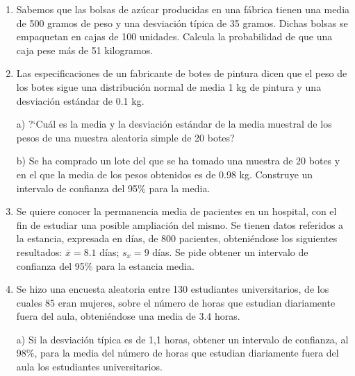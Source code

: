\begin{adjustwidth}{20pt}{10pt}
\begin{enumerate}[PB. 1. ]
	\item 	Sabemos que las bolsas de azúcar producidas en una fábrica tienen una media de 500 gramos de peso y una desviación típica de 35 gramos. Dichas bolsas se empaquetan en cajas de 100 unidades. Calcula la probabilidad de que una caja pese más de 51 kilogramos.
		
		\hspace{-1cm}\vspace{1cm}
		
	\item 	Las especificaciones de un fabricante de botes de pintura dicen que el peso de los botes sigue una distribución normal de media 1 kg de pintura y una desviación estándar de 0.1 kg.

a) ?`Cuál es la media y la desviación estándar de la media muestral de los pesos de una muestra aleatoria simple de 20 botes?

b) Se ha comprado un lote del que se ha tomado una muestra de 20 botes y en el que la media de los pesos obtenidos es de 0.98 kg. Construye un intervalo de confianza del 95\% para la media.
		
		\hspace{-1cm}\vspace{1cm}
		
			
	\item 	Se quiere conocer la permanencia media de pacientes en un hospital, con el fin de estudiar una posible ampliación del mismo. Se tienen datos referidos a la estancia, expresada en
días, de 800 pacientes, obteniéndose los siguientes resultados: $\bar x= 8.1$ días; $s_x = 9$ días. Se pide obtener un intervalo de confianza del 95\% para la estancia media.
		
		\hspace{-1cm}\vspace{1cm}
		
	\item 	Se hizo una encuesta aleatoria entre 130 estudiantes universitarios, de los cuales 85 eran mujeres, sobre el número de horas que estudian diariamente fuera del aula, obteniéndose una media de 3.4 horas.

a) Si la desviación típica es de 1,1 horas, obtener un intervalo de confianza, al 98\%, para la media del número de horas que estudian diariamente fuera del aula los estudiantes universitarios.


\end{enumerate}
\end{adjustwidth}
